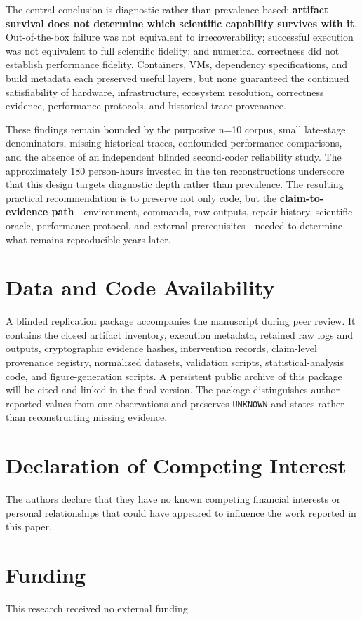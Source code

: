 \documentclass[a4paper,fleqn]{cas-dc}
\begin{document}
The central conclusion is diagnostic rather than prevalence-based: \textbf{artifact survival does not determine which scientific capability survives with it}. Out-of-the-box failure was not equivalent to irrecoverability; successful execution was not equivalent to full scientific fidelity; and numerical correctness did not establish performance fidelity. Containers, VMs, dependency specifications, and build metadata each preserved useful layers, but none guaranteed the continued satisfiability of hardware, infrastructure, ecosystem resolution, correctness evidence, performance protocols, and historical trace provenance.

These findings remain bounded by the purposive n=10 corpus, small late-stage denominators, missing historical traces, confounded performance comparisons, and the absence of an independent blinded second-coder reliability study. The approximately 180 person-hours invested in the ten reconstructions underscore that this design targets diagnostic depth rather than prevalence. The resulting practical recommendation is to preserve not only code, but the \textbf{claim-to-evidence path}—environment, commands, raw outputs, repair history, scientific oracle, performance protocol, and external prerequisites—needed to determine what remains reproducible years later.


\section*{Data and Code Availability}
A blinded replication package accompanies the manuscript during peer review. It contains the closed artifact inventory, execution metadata, retained raw logs and outputs, cryptographic evidence hashes, intervention records, claim-level provenance registry, normalized datasets, validation scripts, statistical-analysis code, and figure-generation scripts. A persistent public archive of this package will be cited and linked in the final version. The package distinguishes author-reported values from our observations and preserves \texttt{UNKNOWN} and \protect{} states rather than reconstructing missing evidence.

\section*{Declaration of Competing Interest}
The authors declare that they have no known competing financial interests or personal relationships that could have appeared to influence the work reported in this paper.

\section*{Funding}
This research received no external funding.



\end{document}
